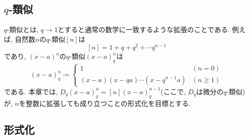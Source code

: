 \documentclass[11pt]{jarticle}
\theoremstyle{mystyle}
\newcommand{\0}{\textbf{0}}
\newcommand{\1}{\textbf{1}}
\newcommand{\2}{\textbf{2}}
\begin{document}
\subsection{$q$-類似}
$q$-類似とは, $q \to 1$とすると通常の数学に一致するような拡張のことである. 例えば, 自然数$n$の$q$-類似$[n]$は
\[
  [n] = 1 + q + q^2 + \cdots q ^ {n -1} 
\]
であり, $(x-a)^n$の$q$-類似$(x-a)^n_q$は
\[
  (x-a)^n_q \coloneqq \begin{cases}
                                  1 & (n=0)\\
                                  (x-a)(x-qa)\cdots(x-q^{n-1}a) & (n\ge1)
                                \end{cases}
\]
である. 本章では, $D_q (x-a)^n_q = [n] (x-a)^{n-1}_q$(ここで, $D_q$は微分の$q$-類似)が, $n$を整数に拡張しても成り立つことの形式化を目標とする. 
\subsection{形式化}
\end{document}
